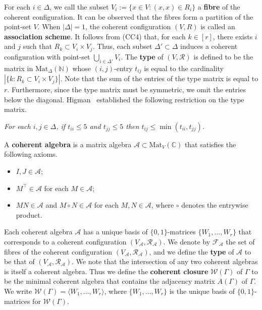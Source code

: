For each $i \in \Delta$, we call the subset $V_i := \{ x \in V : (x,x) \in R_i \}$ a \textbf{fibre} of the coherent configuration. It can be observed that the fibres form a partition of the point-set $V$. When $|\Delta| = 1$, the coherent configuration $(V, R)$ is called an \textbf{association scheme}. It follows from (CC4) that, for each $k \in [r]$, there exists $i$ and $j$ such that $R_k \subset V_i \times V_j$. Thus, each subset $\Delta' \subset \Delta$ induces a coherent configuration with point-set $\bigcup_{i \in \Delta'} V_i$. The \textbf{type} of $(V, \mathcal{R})$ is defined to be the matrix in $\mathrm{Mat}_\Delta(\mathbb{N})$ whose $(i,j)$-entry $t_{ij}$ is equal to the cardinality $|\{ k : R_k \subset V_i \times V_j \}|$. Note that the sum of the entries of the type matrix is equal to $r$. Furthermore, since the type matrix must be symmetric, we omit the entries below the diagonal. Higman~\cite{Higman19} established the following restriction on the type matrix.

\begin{lemma} \label{lemma:t_ii}
\textit{For each $i,j \in \Delta$, if $t_{ii} \leq 5$ and $t_{jj} \leq 5$ then $t_{ij} \leq \min(t_{ii}, t_{jj})$.}
\end{lemma}

\begin{definition}
    A \textbf{coherent algebra} is a matrix algebra $\mathcal{A} \subset \mathrm{Mat}_{V}(\mathbb{C})$ that satisfies the following axioms.

    \begin{itemize}
        \item $I, J \in \mathcal{A}$;
        \item $M^\top \in \mathcal{A}$ for each $M \in \mathcal{A}$;
        \item $MN \in \mathcal{A}$ and $M \circ N \in \mathcal{A}$ for each $M, N \in \mathcal{A}$, where $\circ$ denotes the entrywise product.
    \end{itemize}
\end{definition}

Each coherent algebra $\mathcal{A}$ has a unique basis of $\{0,1\}$-matrices $\{W_1, \ldots, W_r\}$ that corresponds to a coherent configuration $(V_\mathcal{A}, \mathcal{R}_\mathcal{A})$. We denote by $\mathcal{F}_\mathcal{A}$ the set of fibres of the coherent configuration $(V_\mathcal{A}, \mathcal{R}_\mathcal{A})$, and we define the \textbf{type} of $\mathcal{A}$ to be that of $(V_\mathcal{A}, \mathcal{R}_\mathcal{A})$. We note that the intersection of any two coherent algebras is itself a coherent algebra. Thus we define the \textbf{coherent closure} $\mathcal{W}(\Gamma)$ of $\Gamma$ to be the minimal coherent algebra that contains the adjacency matrix $A(\Gamma)$ of $\Gamma$. We write $\mathcal{W}(\Gamma) = \langle W_1, \ldots, W_r \rangle$, where $\{W_1, \ldots, W_r\}$ is the unique basis of $\{0,1\}$-matrices for $\mathcal{W}(\Gamma)$.

